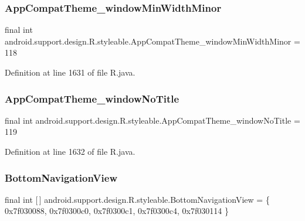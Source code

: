 \subsubsection{\texorpdfstring{AppCompatTheme\_windowMinWidthMinor}{AppCompatTheme\_windowMinWidthMinor}}
{\footnotesize\ttfamily final int android.\+support.\+design.\+R.\+styleable.\+App\+Compat\+Theme\+\_\+window\+Min\+Width\+Minor = 118\hspace{0.3cm}{\ttfamily [static]}}



Definition at line 1631 of file R.\+java.

\mbox{\label{classandroid_1_1support_1_1design_1_1_r_1_1styleable_a7f38f8c63670995f4f038c7be8cc6054}} 
\subsubsection{\texorpdfstring{AppCompatTheme\_windowNoTitle}{AppCompatTheme\_windowNoTitle}}
{\footnotesize\ttfamily final int android.\+support.\+design.\+R.\+styleable.\+App\+Compat\+Theme\+\_\+window\+No\+Title = 119\hspace{0.3cm}{\ttfamily [static]}}



Definition at line 1632 of file R.\+java.

\mbox{\label{classandroid_1_1support_1_1design_1_1_r_1_1styleable_a172fd3fafa033a32b591f783f5794d3e}} 
\subsubsection{\texorpdfstring{BottomNavigationView}{BottomNavigationView}}
{\footnotesize\ttfamily final int \mbox{[}$\,$\mbox{]} android.\+support.\+design.\+R.\+styleable.\+Bottom\+Navigation\+View = \{ 0x7f030088, 0x7f0300c0, 0x7f0300c1, 0x7f0300c4, 0x7f030114 \}\hspace{0.3cm}{\ttfamily [static]}}



